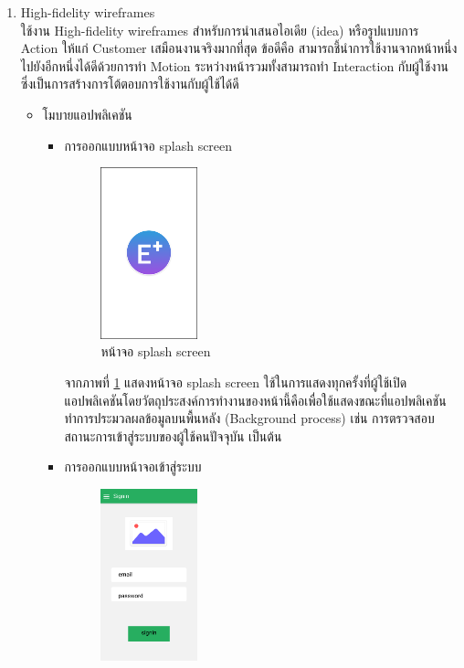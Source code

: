 \begin{enumerate}
		\item High-fidelity wireframes \\ 
		ใช้งาน High-fidelity wireframes สำหรับการนำเสนอไอเดีย (idea) หรือรูปแบบการ Action ให้แก่ Customer เสมือนงานจริงมากที่สุด ข้อดีคือ สามารถชี้นำการใช้งานจากหน้าหนึ่งไปยังอีกหนึ่งได้ดีด้วยการทำ Motion ระหว่างหน้ารวมทั้งสามารถทำ Interaction กับผู้ใช้งานซึ่งเป็นการสร้างการโต้ตอบการใช้งานกับผู้ใช้ได้ดี
		\begin{itemize}
			\item โมบายแอปพลิเคชัน
			\begin{itemize}
				\item การออกแบบหน้าจอ splash screen 
				\begin{figure}[H]
					\centering
					\includegraphics[width=0.3\textwidth]{Figures/3/UIMobile/splash_screen}
					\caption{หน้าจอ splash screen}
					\label{Fig:splash_screen}
				\end{figure}
				จากภาพที่ \ref{Fig:splash_screen} แสดงหน้าจอ splash screen ใช้ในการแสดงทุกครั้งที่ผู้ใช้เปิดแอปพลิเคชันโดยวัตถุประสงค์การทำงานของหน้านี้คือเพื่อใช้แสดงขณะที่แอปพลิเคชันทำการประมวลผลข้อมูลบนพื้นหลัง (Background process) เช่น การตรวจสอบสถานะการเข้าสู่ระบบของผู้ใช้คนปัจจุบัน เป็นต้น
				\item การออกแบบหน้าจอเข้าสู่ระบบ
				\begin{figure}[H]
					\centering
					\includegraphics[width=0.3\textwidth]{Figures/3/UIMobile/sign_in}

\end{figure}
\end{itemize}
\end{itemize}
\end{enumerate}
